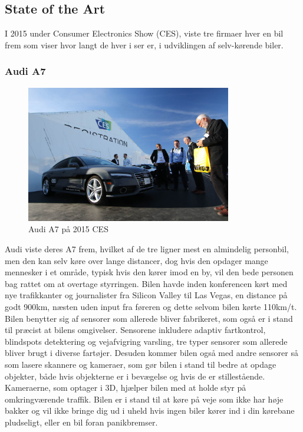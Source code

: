 \subsection{State of the Art} 
I 2015 under Consumer Electronics Show (CES), viste tre firmaer hver en bil frem som viser hvor langt de hver i ser er, i udviklingen af selv-kørende biler.\cite{CES}
\subsubsection{Audi A7}
\begin{figure}[h!]
	\centering
	\includegraphics[width=0.8\textwidth]{images/150106_0345_ces.jpg}
	\caption{Audi A7 på 2015 CES}
	\label{fig:Audi_A7}
\end{figure}
Audi viste deres A7 frem, hvilket af de tre ligner mest en almindelig personbil, men den kan selv køre over lange distancer, dog hvis den opdager mange mennesker i et område, typisk hvis den kører imod en by, vil den bede personen bag rattet om at overtage styrringen. Bilen havde inden konferencen kørt med nye trafikkanter og journalister fra Silicon Valley til Las Vegas, en distance på godt 900km, næsten uden input fra føreren og dette selvom bilen kørte 110km/t. Bilen benytter sig af sensorer som allerede bliver fabrikeret, som også er i stand til præcist at bilens omgivelser. Sensorene inkludere adaptiv fartkontrol, blindspots detektering og vejafvigring varsling, tre typer sensorer som allerede bliver brugt i diverse fartøjer. Desuden kommer bilen også med andre sensorer så som lasere skannere og kameraer, som gør bilen i stand til bedre at opdage objekter, både hvis objekterne er i bevægelse og hvis de er stillestående. Kameraerne, som optager i 3D, hjælper bilen med at holde styr på omkringværende traffik. Bilen er i stand til at køre på veje som ikke har høje bakker og vil ikke bringe dig ud i uheld hvis ingen biler kører ind i din kørebane pludseligt, eller en bil foran panikbremser.
